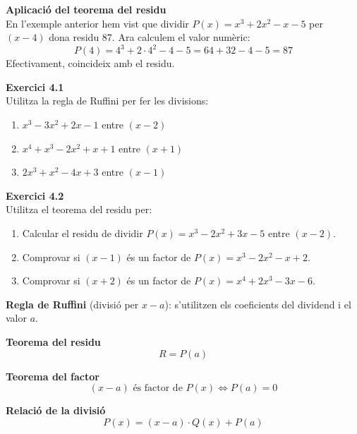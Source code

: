 \documentclass[12pt]{article}
\begin{document}
\begin{exemple}
\textbf{Aplicació del teorema del residu}\\
En l'exemple anterior hem vist que dividir $P(x) = x^3+2x^2-x-5$ per $(x-4)$ dona residu $87$.
Ara calculem el valor numèric:
\[
P(4) = 4^3 + 2 \cdot 4^2 - 4 - 5 = 64 + 32 - 4 - 5 = 87
\]
Efectivament, coincideix amb el residu. \checkmark
\end{exemple}

\begin{exercici}
\textbf{Exercici 4.1}\\
Utilitza la regla de Ruffini per fer les divisions:
\begin{enumerate}[label=\alph*)]
    \item $x^3 - 3x^2 + 2x - 1$ entre $(x-2)$
    \item $x^4 + x^3 - 2x^2 + x + 1$ entre $(x+1)$
    \item $2x^3 + x^2 - 4x + 3$ entre $(x-1)$
\end{enumerate}
\end{exercici}

\begin{exercici}
\textbf{Exercici 4.2}\\
Utilitza el teorema del residu per:
\begin{enumerate}[label=\alph*)]
    \item Calcular el residu de dividir $P(x) = x^3 - 2x^2 + 3x - 5$ entre $(x-2)$.
    \item Comprovar si $(x-1)$ és un factor de $P(x) = x^3 - 2x^2 - x + 2$.
    \item Comprovar si $(x+2)$ és un factor de $P(x) = x^4 + 2x^3 - 3x - 6$.
\end{enumerate}
\end{exercici}

\begin{resum}[title=Resum 4: Ruffini i Teorema del Residu]
\textbf{Regla de Ruffini} (divisió per $x-a$): s'utilitzen els coeficients del dividend i el valor $a$.

\textbf{Teorema del residu}
\[
R = P(a)
\]

\textbf{Teorema del factor}
\[
(x-a) \text{ és factor de } P(x) \iff P(a) = 0
\]

\textbf{Relació de la divisió}
\[
P(x) = (x-a) \cdot Q(x) + P(a)
\]
\end{resum}
\end{document}
